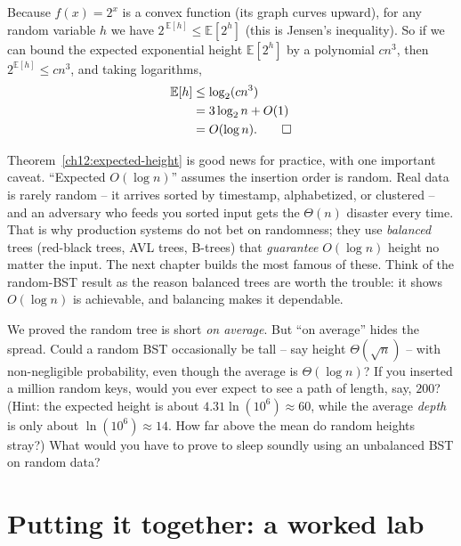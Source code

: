 \begin{formalbox}
\begin{lemma}
\label{ch12:jensen}
Because $f(x) = 2^x$ is a convex function (its graph curves upward), for any random variable $h$ we have
$2^{\,\mathbb{E}[h]} \le \mathbb{E}\!\left[2^{h}\right]$ (this is Jensen's inequality). So if we
can bound the expected exponential height $\mathbb{E}[2^h]$ by a polynomial $cn^3$, then
$2^{\mathbb{E}[h]} \le cn^3$, and taking logarithms,
\begin{align*}
\mathbb{E}[h] &\le \log_2(cn^3) \\
              &= 3\log_2 n + O(1) \\
              &= O(\log n). \qedhere
\end{align*}
\end{lemma}
\end{formalbox}

\begin{aestheticbox}
Theorem~\ref{ch12:expected-height} is good news for practice, with one important
caveat. ``Expected $O(\log n)$'' assumes the insertion order is random. Real data is rarely
random -- it arrives sorted by timestamp, alphabetized, or clustered -- and an adversary who
feeds you sorted input gets the $\Theta(n)$ disaster every time. That is why production systems
do not bet on randomness; they use \emph{balanced} trees (red-black trees, AVL trees, B-trees)
that \emph{guarantee} $O(\log n)$ height no matter the input. The next chapter builds the most
famous of these. Think of the random-BST result as the reason balanced trees are worth the
trouble: it shows $O(\log n)$ is achievable, and balancing makes it dependable.
\end{aestheticbox}

\begin{walkbox}
We proved the random tree is short \emph{on average}. But
``on average'' hides the spread. Could a random BST occasionally be tall -- say height
$\Theta(\sqrt n)$ -- with non-negligible probability, even though the average is $\Theta(\log
n)$? If you inserted a million random keys, would you ever expect to see a path of length, say,
$200$? (Hint: the expected height is about $4.31 \ln(10^6) \approx 60$, while the average
\emph{depth} is only about $\ln(10^6) \approx 14$. How far above the mean do random heights
stray?) What
would you have to prove to sleep soundly using an unbalanced BST on random data?
\end{walkbox}

\section{Putting it together: a worked lab}

